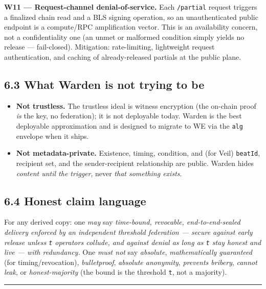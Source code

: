\documentclass[
  11pt,
]{article}
\providecommand{\tightlist}{%
  \setlength{\itemsep}{0pt}\setlength{\parskip}{0pt}}
\begin{document}
\textbf{W11 --- Request-channel denial-of-service.} Each
\texttt{/partial} request triggers a finalized chain read and a BLS
signing operation, so an unauthenticated public endpoint is a
compute/RPC amplification vector. This is an availability concern, not a
confidentiality one (an unmet or malformed condition simply yields no
release --- fail-closed). Mitigation: rate-limiting, lightweight request
authentication, and caching of already-released partials at the public
plane.

\subsection{6.3 What Warden is not trying to
be}\label{what-warden-is-not-trying-to-be}

\begin{itemize}
\tightlist
\item
  \textbf{Not trustless.} The trustless ideal is witness encryption (the
  on-chain proof \emph{is} the key, no federation); it is not deployable
  today. Warden is the best deployable approximation and is designed to
  migrate to WE via the \texttt{alg} envelope when it ships.
\item
  \textbf{Not metadata-private.} Existence, timing, condition, and (for
  Veil) \texttt{beatId}, recipient set, and the sender-recipient
  relationship are public. Warden hides \emph{content until the
  trigger}, never \emph{that something exists}.
\end{itemize}

\subsection{6.4 Honest claim language}\label{honest-claim-language}

For any derived copy: one \emph{may} say \emph{time-bound, revocable,
end-to-end-sealed delivery enforced by an independent threshold
federation --- secure against early release unless \texttt{t} operators
collude, and against denial as long as \texttt{t} stay honest and live
--- with redundancy.} One \emph{must not} say \emph{absolute},
\emph{mathematically guaranteed} (for timing/revocation),
\emph{bulletproof}, \emph{absolute anonymity}, \emph{prevents bribery},
\emph{cannot leak}, or \emph{honest-majority} (the bound is the
threshold \texttt{t}, not a majority).

\begin{center}\rule{0.5\linewidth}{0.5pt}\end{center}
\end{document}
